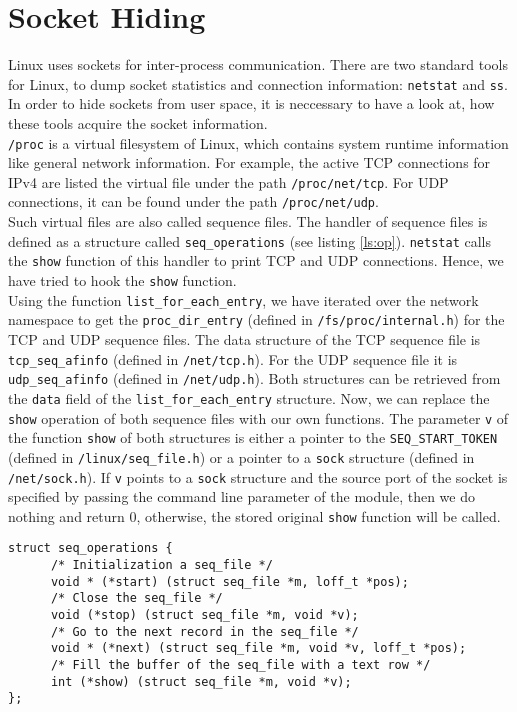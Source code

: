\section{Socket Hiding}
Linux uses sockets for inter-process communication. There are two standard tools for Linux, to dump socket statistics and connection information: \texttt{netstat} and \texttt{ss}. In order to hide sockets from user space, it is neccessary to have a look at, how these tools acquire the socket information. \\
\verb+/proc+ is a virtual filesystem of Linux, which contains system runtime 
information like general network information. For example, the active TCP 
connections for IPv4 are listed the virtual file under the path 
\verb+/proc/net/tcp+. For UDP connections, it can be found under the path 
\verb+/proc/net/udp+.\\
Such virtual files are also called sequence files. The handler of sequence files 
is defined as a structure called \verb+seq_operations+ (see listing 
\ref{ls:op}). \verb+netstat+ calls the \verb+show+ function of this handler to print TCP and UDP 
connections. Hence, we have tried to hook the \verb+show+ function.\\
Using the function \verb+list_for_each_entry+, we have iterated over the network 
namespace to get the \verb+proc_dir_entry+ (defined in 
\verb+/fs/proc/internal.h+) for the TCP and UDP sequence files. The data 
structure of the TCP sequence file is \verb+tcp_seq_afinfo+ (defined in 
\verb+/net/tcp.h+). For the UDP sequence file it is \verb+udp_seq_afinfo+ 
(defined in \verb+/net/udp.h+). Both structures can be retrieved from the 
\verb+data+ field of the \verb+list_for_each_entry+ structure. Now, we can 
replace the \verb+show+ operation of both sequence files with our own 
functions. The parameter \verb+v+ of the function \verb+show+ of both 
structures is either a pointer to the \verb+SEQ_START_TOKEN+ (defined in 
\verb+/linux/seq_file.h+) or a pointer to a \verb+sock+ structure (defined in 
\verb+/net/sock.h+). If \verb+v+ points to a \verb+sock+ structure and the 
source port of the socket is specified by passing the command line parameter of 
the module, then we do nothing and return 0, otherwise, the stored original 
\verb+show+ function will be called.
\lstset{escapechar=,style=customc}
\begin{lstlisting}[captionpos=b, caption={The \texttt{seq\_operations} structure defined in \texttt{/linux/seq\_file.h}}, label={ls:op}]
struct seq_operations {
      /* Initialization a seq_file */		
      void * (*start) (struct seq_file *m, loff_t *pos);
      /* Close the seq_file */
      void (*stop) (struct seq_file *m, void *v);
      /* Go to the next record in the seq_file */
      void * (*next) (struct seq_file *m, void *v, loff_t *pos);
      /* Fill the buffer of the seq_file with a text row */
      int (*show) (struct seq_file *m, void *v);
};
\end{lstlisting}
